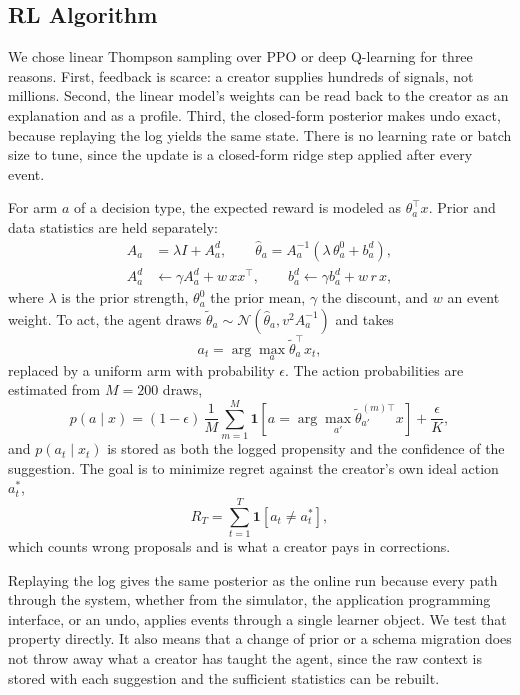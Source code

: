 \documentclass{ieeeaccess}
\begin{document}
\subsection{RL Algorithm}
We chose linear Thompson sampling over PPO or deep Q-learning for three reasons. First, feedback is scarce: a creator supplies hundreds of signals, not millions. Second, the linear model's weights can be read back to the creator as an explanation and as a profile. Third, the closed-form posterior makes undo exact, because replaying the log yields the same state. There is no learning rate or batch size to tune, since the update is a closed-form ridge step applied after every event.

For arm $a$ of a decision type, the expected reward is modeled as $\theta_a^{\top} x$. Prior and data statistics are held separately:
\begin{align}
A_a &= \lambda I + A_a^{d}, \qquad \hat\theta_a = A_a^{-1}\left(\lambda\,\theta_a^{0} + b_a^{d}\right), \label{eq:post}\\
A_a^{d} &\leftarrow \gamma A_a^{d} + w\,x x^{\top}, \qquad b_a^{d} \leftarrow \gamma b_a^{d} + w\,r\,x, \label{eq:upd}
\end{align}
where $\lambda$ is the prior strength, $\theta_a^{0}$ the prior mean, $\gamma$ the discount, and $w$ an event weight. To act, the agent draws $\tilde\theta_a \sim \mathcal{N}(\hat\theta_a, v^{2} A_a^{-1})$ and takes
\begin{equation}
a_t = \arg\max_a \tilde\theta_a^{\top} x_t, \label{eq:ts}
\end{equation}
replaced by a uniform arm with probability $\epsilon$. The action probabilities are estimated from $M=200$ draws,
\begin{equation}
p(a \mid x) = (1-\epsilon)\,\frac{1}{M}\sum_{m=1}^{M} \mathbf{1}\left[a = \arg\max_{a'} \tilde\theta_{a'}^{(m)\top} x\right] + \frac{\epsilon}{K}, \label{eq:prop}
\end{equation}
and $p(a_t \mid x_t)$ is stored as both the logged propensity and the confidence of the suggestion. The goal is to minimize regret against the creator's own ideal action $a_t^{*}$,
\begin{equation}
R_T = \sum_{t=1}^{T} \mathbf{1}\left[a_t \neq a_t^{*}\right], \label{eq:regret}
\end{equation}
which counts wrong proposals and is what a creator pays in corrections.

Replaying the log gives the same posterior as the online run because every path through the system, whether from the simulator, the application programming interface, or an undo, applies events through a single learner object. We test that property directly. It also means that a change of prior or a schema migration does not throw away what a creator has taught the agent, since the raw context is stored with each suggestion and the sufficient statistics can be rebuilt.
\end{document}
